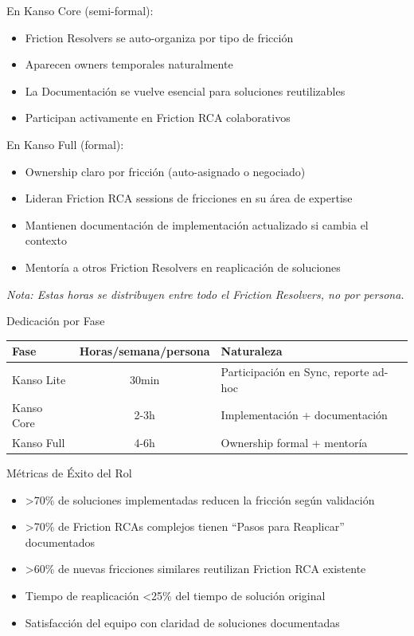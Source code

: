 En Kanso Core (semi-formal):
\begin{itemize}
    \item Friction Resolvers se auto-organiza por tipo de fricción
    \item Aparecen owners temporales naturalmente
    \item La Documentación se vuelve esencial para soluciones reutilizables
    \item Participan activamente en Friction RCA colaborativos
\end{itemize}

En Kanso Full (formal):
\begin{itemize}
    \item Ownership claro por fricción (auto-asignado o negociado)
    \item Lideran Friction RCA sessions de fricciones en su área de expertise
    \item Mantienen documentación de implementación actualizado si cambia el contexto
    \item Mentoría a otros Friction Resolvers en reaplicación de soluciones
\end{itemize}

\textit{Nota: Estas horas se distribuyen entre todo el Friction Resolvers, no por persona.}

Dedicación por Fase
\begin{center}
\small
\begin{tabular}{|l|c|l|}
\hline
\textbf{Fase} & \textbf{Horas/semana/persona} & \textbf{Naturaleza} \\ \hline
Kanso Lite & 30min & Participación en Sync, reporte ad-hoc \\ \hline
Kanso Core & 2-3h & Implementación + documentación \\ \hline
Kanso Full & 4-6h & Ownership formal + mentoría \\ \hline
\end{tabular}
\end{center}

Métricas de Éxito del Rol

\begin{itemize}
    \item >70\% de soluciones implementadas reducen la fricción según validación
    \item >70\% de Friction RCAs complejos tienen ``Pasos para Reaplicar'' documentados
    \item >60\% de nuevas fricciones similares reutilizan Friction RCA existente
    \item Tiempo de reaplicación <25\% del tiempo de solución original
    \item Satisfacción del equipo con claridad de soluciones documentadas
\end{itemize}

